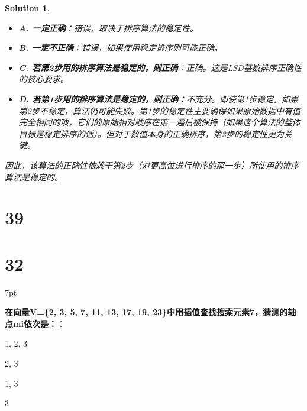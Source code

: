 \documentclass[UTF8]{report}
\newtheorem{solution}{Solution}
\theoremstyle{MyLineTheoremStyle} %
\theoremstyle{MyBlockTheoremStyle} %
\theoremstyle{MySubsubsectionStyle} %
\newenvironment{graybox}{%
        \def\FrameCommand{%
        \hspace{1pt}%
        {\color{gray}\small \vrule width 2pt}%
        {\color{graybox_color}\vrule width 4pt}%
        \colorbox{graybox_color}%
        }%
        \MakeFramed{\advance\hsize-\width\FrameRestore}%
        \noindent\hspace{-4.55pt}%
        \begin{adjustwidth}{}{7pt}%
        \vspace{2pt}\vspace{2pt}%
        }
        {%
        \vspace{2pt}\end{adjustwidth}\endMakeFramed%
        }
\begin{document}
\begin{solution}
\begin{itemize}
    \item \textbf{A. 一定正确}：错误，取决于排序算法的稳定性。
    \item \textbf{B. 一定不正确}：错误，如果使用稳定排序则可能正确。
    \item \textbf{C. 若第2步用的排序算法是稳定的，则正确}：正确。这是LSD基数排序正确性的核心要求。
    \item \textbf{D. 若第1步用的排序算法是稳定的，则正确}：不充分。即使第1步稳定，如果第2步不稳定，算法仍可能失败。第1步的稳定性主要确保如果原始数据中有值完全相同的项，它们的原始相对顺序在第一遍后被保持（如果这个算法的整体目标是稳定排序的话）。但对于数值本身的正确排序，第2步的稳定性更为关键。
\end{itemize}
因此，该算法的正确性依赖于第2步（对更高位进行排序的那一步）所使用的排序算法是稳定的。
\end{solution}





\section*{39}




\section*{32}

\begin{graybox}
\textbf{在向量V=\{2, 3, 5, 7, 11, 13, 17, 19, 23\}中用插值查找搜索元素7，猜测的轴点mi依次是：}：
\begin{circledenum}
    \item 1, 2, 3
    \item 2, 3
    \item 1, 3
    \item 3
\end{circledenum}
\end{graybox}
\end{document}
